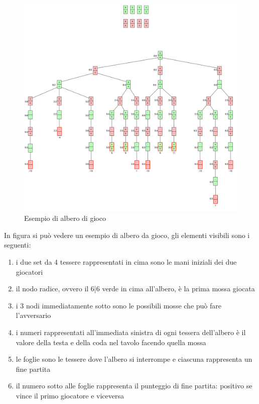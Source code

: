 \documentclass[a4paper,12pt]{report} %
\begin{document}
\begin{figure}[h!]
    \centering
    \includegraphics[width=1\textwidth]{imgs/gametree.png} %
    \caption{Esempio di albero di gioco}
    \label{fig:etichetta}
\end{figure}

In figura si può vedere un esempio di albero da gioco, gli elementi visibili sono i seguenti:

\begin{enumerate}
    \item i due set da 4 tessere rappresentati in cima sono le mani iniziali dei due giocatori
    \item il nodo radice, ovvero il 6|6 verde in cima all'albero, è la prima mossa giocata
    \item i 3 nodi immediatamente sotto sono le possibili mosse che può fare l'avversario
    \item i numeri rappresentati all'immediata sinistra di ogni tessera dell'albero è il valore della testa e della coda nel tavolo facendo quella mossa
    \item le foglie sono le tessere dove l'albero si interrompe e ciascuna rappresenta un fine partita
    \item il numero sotto alle foglie rappresenta il punteggio di fine partita: positivo se vince il primo giocatore e viceversa  
\end{enumerate}
\end{document}
